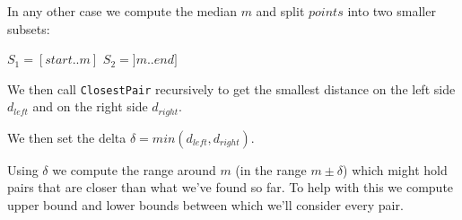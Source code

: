 \documentclass{tufte-handout}
\begin{document}
  In any other case we compute the median $m$ and split $points$ into two smaller subsets:\newline

  $S_1 = [start..m]$\newline
  $S_2 = ]m..end]$\newline

  We then call \verb+ClosestPair+ recursively to get the smallest distance on the left side $d_{left}$ and on the right side $d_{right}$.

We then set the delta $\delta = min(d_{left}, d_{right})$.\newline

Using $\delta$ we compute the range around $m$ (in the range $m \pm \delta$) which might hold pairs that are closer than what we've found so far.
To help with this we compute upper bound and lower bounds between which we'll consider every pair.
\end{document}
